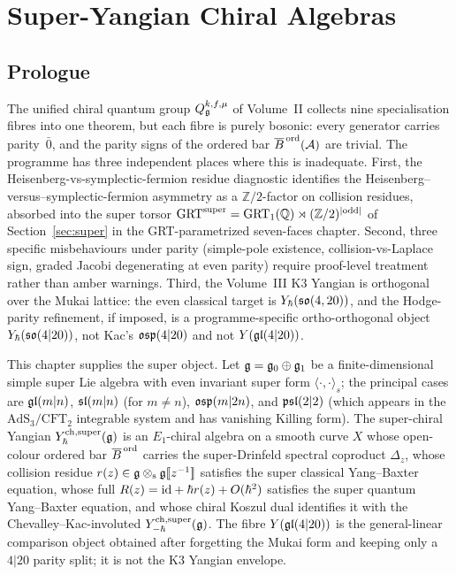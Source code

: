 \chapter{Super-Yangian Chiral Algebras}
\label{ch:super-chiral-yangian}

\section*{Prologue}

The unified chiral quantum group
$Q_{\mathfrak{g}}^{k,f,\mu}$ of Volume~II collects nine specialisation fibres into
one theorem, but each fibre is purely bosonic: every generator carries
parity~$\bar 0$, and the parity signs of the
ordered bar $\overline{B}^{\,\mathrm{ord}}(\mathcal{A})$ are trivial. The programme has three independent
places where this is inadequate. First, the
Heisenberg-vs-symplectic-fermion residue diagnostic identifies the
Heisenberg--versus--symplectic-fermion asymmetry as a
$\mathbb{Z}/2$-factor on collision residues, absorbed into the super
torsor $\mathrm{GRT}^{\mathrm{super}} = \mathrm{GRT}_1(\mathbb{Q})\rtimes(\mathbb{Z}/2)^{|\mathrm{odd}|}$
of Section~\ref{sec:super} in
the GRT-parametrized seven-faces chapter. Second, three specific
misbehaviours under parity (simple-pole existence, collision-vs-Laplace
sign, graded Jacobi degenerating at even parity) require proof-level
treatment rather than amber warnings. Third, the Volume~III K3 Yangian
is orthogonal over the Mukai lattice: the even classical target is
$Y_{\hbar}(\mathfrak{so}(4,20))$, and the Hodge-parity refinement, if imposed,
is a programme-specific ortho-orthogonal object
$Y_{\hbar}(\mathfrak{so}(4|20))$, not Kac's $\mathfrak{osp}(4|20)$ and not
$Y(\mathfrak{gl}(4|20))$.

This chapter supplies the super object. Let $\mathfrak{g} = \mathfrak{g}_0\oplus\mathfrak{g}_1$ be
a finite-dimensional simple super Lie algebra with even invariant super
form $\langle\cdot,\cdot\rangle_s$; the principal cases are $\mathfrak{gl}(m|n)$,
$\mathfrak{sl}(m|n)$ (for $m\neq n$), $\mathfrak{osp}(m|2n)$, and $\mathfrak{psl}(2|2)$ (which
appears in the $\mathrm{AdS}_3/\mathrm{CFT}_2$ integrable system and has
vanishing Killing form). The super-chiral Yangian
$Y^{\mathrm{ch},\mathrm{super}}_{\hbar}(\mathfrak{g})$ is an $E_1$-chiral algebra on a smooth curve $X$
whose open-colour ordered bar $\overline{B}^{\,\mathrm{ord}}$ carries the super-Drinfeld
spectral coproduct $\Delta_z$, whose collision residue
$r(z) \in \mathfrak{g}\mathbin{\otimes_{\mathrm{s}}}\mathfrak{g}[\![z^{-1}]\!]$ satisfies the super classical
Yang--Baxter equation, whose full $R(z) = \mathrm{id} + \hbar r(z) +
O(\hbar^2)$ satisfies the super quantum Yang--Baxter equation, and whose
chiral Koszul dual identifies it with the Chevalley--Kac-involuted
$Y^{\mathrm{ch},\mathrm{super}}_{-\hbar}(\mathfrak{g})$. The fibre $Y(\mathfrak{gl}(4|20))$ is the
general-linear comparison object obtained after forgetting the Mukai
form and keeping only a $4|20$ parity split; it is not the K3 Yangian
envelope.

